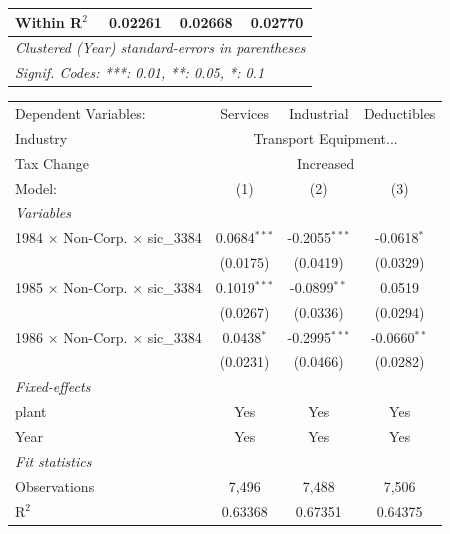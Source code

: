 \documentclass[
  12pt]{article}
\theoremstyle{definition}
\theoremstyle{remark}
\begin{document}
\begin{table}
\begin{minipage}{\linewidth}
\begin{tabular}{lccc}
   Within R$^2$                                  & 0.02261        & 0.02668       & 0.02770\\  
   \midrule \midrule
   \multicolumn{4}{l}{\emph{Clustered (Year) standard-errors in parentheses}}\\
   \multicolumn{4}{l}{\emph{Signif. Codes: ***: 0.01, **: 0.05, *: 0.1}}\\
\end{tabular}
\par\endgroup
\begingroup
\centering
\begin{tabular}{lccc}
   \tabularnewline \midrule \midrule
   Dependent Variables:                          & Services       & Industrial      & Deductibles\\  
   Industry & \multicolumn{3}{c}{Transport Equipment...} \\ 
   Tax Change & \multicolumn{3}{c}{Increased} \\ 
   Model:                                        & (1)            & (2)             & (3)\\  
   \midrule
   \emph{Variables}\\
   1984 $\times$ Non-Corp. $\times$ sic\_3384    & 0.0684$^{***}$ & -0.2055$^{***}$ & -0.0618$^{*}$\\   
                                                 & (0.0175)       & (0.0419)        & (0.0329)\\   
   1985 $\times$ Non-Corp. $\times$ sic\_3384    & 0.1019$^{***}$ & -0.0899$^{**}$  & 0.0519\\   
                                                 & (0.0267)       & (0.0336)        & (0.0294)\\   
   1986 $\times$ Non-Corp. $\times$ sic\_3384    & 0.0438$^{*}$   & -0.2995$^{***}$ & -0.0660$^{**}$\\   
                                                 & (0.0231)       & (0.0466)        & (0.0282)\\   
   \midrule
   \emph{Fixed-effects}\\
   plant                                         & Yes            & Yes             & Yes\\  
   Year                                          & Yes            & Yes             & Yes\\  
   \midrule
   \emph{Fit statistics}\\
   Observations                                  & 7,496          & 7,488           & 7,506\\  
   R$^2$                                         & 0.63368        & 0.67351         & 0.64375\\  

\end{tabular}
\end{minipage}
\end{table}
\end{document}

